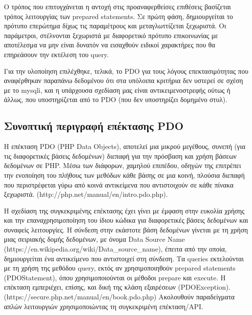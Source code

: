 \documentclass[diploma]{softlab-thesis}
\begin{document}
\bigskip

Ο τρόπος που επιτυγχάνεται η αντοχή στις προαναφερθείσες επιθέσεις βασίζεται
τρόπος λειτουργίας των prepared statements. Σε πρώτη φάση, δημιουργείται το
πρότυπο επερώτημα δίχως τις παραμέτρους και μεταγλωττίζεται ξεχωριστά. Οι
παράμετροι, στέλνονται ξεχωριστά με διαφορετικό πρότυπο επικοινωνίας με
αποτέλεσμα να μην είναι δυνατόν να εισαχθούν ειδικοί χαρακτήρες που θα
επηρεάσουν την εκτέλεση του query.

\bigskip

Για την υλοποίηση επιλέχθηκε, τελικά, το PDO για τους λόγους επεκτασιμότητας
που αναφέρθηκαν παραπάνω δεδομένου ότι στα υπόλοιπα κριτήρια δεν υστερεί σε
σχέση με το mysqli, και η υπάρχουσα σχεδίαση μας είναι αντικειμενοστρεφής ούτως
ή άλλως, που υποστηρίζεται από το PDO (που δεν υποστηρίζει δομημένο στυλ).

\subsection{Συνοπτική περιγραφή επέκτασης PDO}

Η επέκταση PDO (PHP Data Objects), αποτελεί μια μικρού μεγέθους, συνεπή (για
τις διαφορετικές βάσεις δεδομένων) διεπαφή για την πρόσβαση και χρήση βάσεων
δεδομένων σε PHP. Μέσω των διάφορων, χαμηλού επιπέδου, οδηγών της επιτρέπει την
ενοποίηση του πλήθους των μεθόδων κάθε βάσης σε μια κοινή, πλούσια διεπαφή που
περιστρέφεται γύρω από κοινά αντικείμενα που αντιστοιχούν σε κάθε πίνακα ξεχωριστά.
(http://php.net/manual/en/intro.pdo.php).

\bigskip

Η σχεδίαση της συγκεκριμένης επέκτασης έχει γίνει με έμφαση στην ευκολία χρήσης
και την επαναχρησιμοποίηση του ίδιου κώδικα για διαφορετικές βάσεις δεδομένων
και συναφείς λειτουργίες. Η σύνδεση στην εκάστοτε βάση δεδομένων γίνεται με τη
χρήση μιας σειριακής δομής δεδομένων, με όνομα Data Source Name
(https://en.wikipedia.org/wiki/Data\_source\_name), έπειτα από την οποία,
δημιουργείται ένα αντικείμενο που αντιστοιχεί στη σύνδεση. Τα queries
εκτελούνται με τη χρήση της μεθόδου query, εκτός αν χρησιμοποιηθούν prepared
statements (PDOStatement), όπου χρησιμοποιούνται οι μέθοδοι prepare και
execute. Η επέκταση εμπεριέχει, επίσης, και δική της κλάση εξαιρέσεων
(PDOException). (https://secure.php.net/manual/en/book.pdo.php) Ακολουθούν
παραδείγματα απλών λειτουργιών χρησιμοποιώντας τη συγκεκριμένη επέκταση/API.



\end{document}
